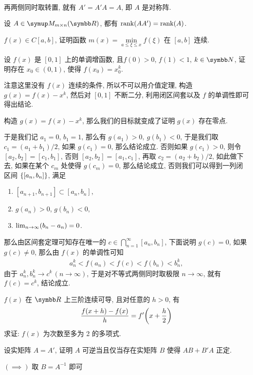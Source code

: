 \begin{exercise}[series=exer]
\begin{answer}
\begin{align*}
      \end{align*}
      再两侧同时取转置, 就有 $ A' = A'A = A $, 即 $ A $ 是对称阵.
  \end{answer}
  \item 设 $ A \in \MM[\R][m \times n] $, 都有 $ \rank(AA') = \rank(A) $.
  \item $ f(x) \in C[a, b] $, 证明函数 $ m(x) = \min\limits_{a \le \xi \le x}f(\xi) $ 在 $ [a, b] $ 连续.
  \item 设 $ f(x) $ 是 $ [0, 1] $ 上的单调增函数, 且$ f(0) > 0 $, $ f(1) < 1 $, $ k \in \N $, 证明存在 $ x_{0} \in (0, 1) $, 使得 $ f(x_{0}) = x_{0}^{k} $.
  \begin{hint}
      注意这里没有 $ f(x) $ 连续的条件, 所以不可以用介值定理, 构造 $ g(x) = f(x) - x^{k} $, 然后对 $ [0, 1] $ 不断二分, 利用闭区间套以及 $ f $ 的单调性即可得出结论.
  \end{hint}
  \begin{answer}
      构造 $ g(x) = f(x) - x^{k} $, 那么我们的目标就变成了证明 $ g(x) $ 存在零点.

      于是我们记 $ a_{1} = 0 $, $ b_{1} = 1 $, 那么有 $ g(a_{1}) > 0,\ g(b_{1}) < 0 $, 于是我们取 $ c_{1} = (a_{1} + b_{1})/2 $, 如果 $ g(c_{1}) = 0 $, 那么结论成立. 否则如果 $ g(c_{1}) > 0 $, 则令 $ [a_{2}, b_{2}] = [c_{1}, b_{1}] $, 否则 $ [a_{2}, b_{2}] = [a_{1}, c_{1}] $, 再取 $ c_{2} = (a_{2} + b_{2})/2 $, 如此做下去, 如果在某个 $ c_{m} $ 处使得 $ g(c_{m}) = 0 $, 那么结论成立, 否则我们可以得到一列闭区间 $ \qty{[a_{n}, b_{n}]} $, 满足
      \begin{enumerate}
          \item $ [a_{n + 1}, b_{n + 1}] \subset [a_{n}, b_{n}] $,
          \item $ g(a_{n}) > 0 $, $ g(b_{n}) < 0 $,
          \item $ \lim_{n \to \infty}(b_{n} - a_{n}) = 0 $.
      \end{enumerate}
      那么由区间套定理可知存在唯一的 $ c \in \bigcap_{n = 1}^{\infty} [a_{n}, b_{n}] $, 下面说明 $ g(c) = 0 $, 如果 $ g(c) \ne 0 $, 那么由 $ f(x) $ 的单调性可知
      \begin{align*}
          a_{n}^{k} < f(a_{n}) < f(c) < f(b_{n}) < b_{n}^{k},
      \end{align*}
      由于 $ a_{n}^{k}, b_{n}^{k} \to c^{k}\,(n \to \infty) $, 于是对不等式两侧同时取极限 $ n \to \infty $, 就有 $ f(c) = c^{k} $, 结论成立.
  \end{answer}
  \item $ f(x) $ 在 $ \R $ 上三阶连续可导, 且对任意的 $ h > 0 $, 有
  \begin{align*}
      \frac{f(x + h) - f(x)}{h} = f'\qty(x + \frac{h}{2})
  \end{align*}
  求证: $ f(x) $ 为次数至多为 2 的多项式.
  \item 设实矩阵 $ A = A' $, 证明 $ A $ 可逆当且仅当存在实矩阵 $ B $ 使得 $ AB + B'A $ 正定.
  \begin{hint}
      $ (\implies) $ 取 $ B = A^{-1} $ 即可


\end{hint}
\end{exercise}
